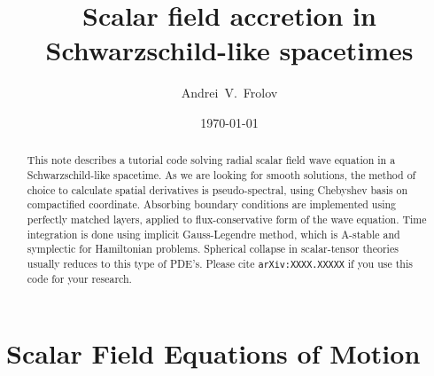\documentclass[aps,prd,reprint,twocolumn,groupedaddress]{revtex4-1}
\begin{document}

\title{Scalar field accretion in Schwarzschild-like spacetimes}

\author{Andrei~V.~Frolov}

\date{\today}

\begin{abstract}
  This note describes a tutorial code solving radial scalar field wave equation in a Schwarzschild-like spacetime. As we are looking for smooth solutions, the method of choice to calculate spatial derivatives is pseudo-spectral, using Chebyshev basis on compactified coordinate. Absorbing boundary conditions are implemented using perfectly matched layers, applied to flux-conservative form of the wave equation. Time integration is done using implicit Gauss-Legendre method, which is A-stable and symplectic for Hamiltonian problems. Spherical collapse in scalar-tensor theories usually reduces to this type of PDE's. Please cite \texttt{arXiv:XXXX.XXXXX} if you use this code for your research.
\end{abstract}


\maketitle

\section{Scalar Field Equations of Motion}
\end{document}
